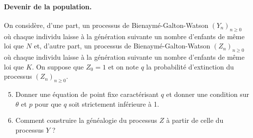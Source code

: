 \paragraph{Devenir de la population.}
On considère, d'une part, un processus de Bienaymé-Galton-Watson $(Y_n)_{n\geq 0}$ où chaque individu laisse à la génération suivante un nombre d'enfants de même loi que $N$ et, d'autre part, un processus de Bienaymé-Galton-Watson $(Z_n)_{n\geq 0}$ où chaque individu laisse à la génération suivante un nombre d'enfants de même loi que $K$. On suppose que $Z_0=1$ et on note $q$ la probabilité d'extinction du processus $(Z_n)_{n\geq 0}$.
\bigskip
\begin{enumerate}
  \setcounter{enumi}{4}
  \item Donner une équation de point fixe caractérisant $q$ et donner une condition sur $\theta$ et $p$ pour que $q$ soit strictement inférieure à 1.
  \item  Comment construire la généalogie du processus $Z$ à partir de celle du processus $Y$ ?
\end{enumerate}
